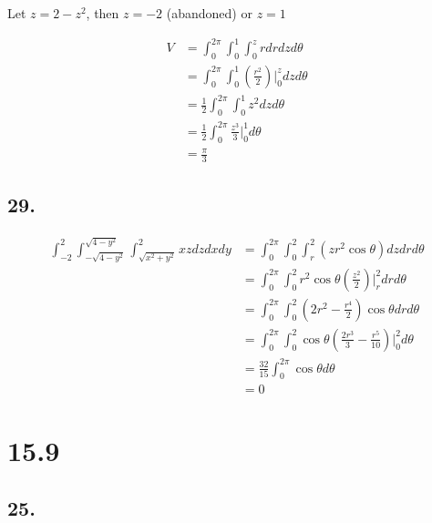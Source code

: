 \documentclass{article}
\begin{document}
  Let $z = 2 - z^2$, then $z = -2$ (abandoned) or $z = 1$

  $$\begin{aligned}
    V &= \int_0^{2\pi} \int_0^1 \int_0^z r dr dz d\theta \\
    &= \int_0^{2\pi} \int_0^1 (\frac{r^2}{2})\biggl|_0^z dz d\theta \\
    &= \frac 1 2 \int_0^{2\pi} \int_0^1 z^2 dz d\theta \\
    &= \frac 1 2 \int_0^{2\pi} \frac{z^3}{3}\biggl|_0^1 d\theta \\
    &= \frac{\pi}{3} 
  \end{aligned}$$

  \subsection*{29. }

  $$\begin{aligned}
    \int_{-2}^2 \int_{-\sqrt{4-y^2}}^{\sqrt{4-y^2}} \int_{\sqrt{x^2+y^2}}^2 xz dz dx dy &= \int_0^{2\pi} \int_0^2 \int_r^2 (zr^2 \cos \theta) dz dr d\theta \\
    &= \int_0^{2\pi} \int_0^2 r^2\cos \theta (\frac{z^2}{2})\biggl|_r^2 dr d\theta \\
    &= \int_0^{2\pi} \int_0^2 (2r^2 - \frac{r^4}{2})\cos \theta  dr d\theta \\
    &= \int_0^{2\pi} \int_0^2 \cos \theta (\frac{2r^3}{3} - \frac{r^5}{10})\biggl|_0^2 d\theta \\
    &= \frac{32}{15}\int_0^{2\pi} \cos \theta  d\theta \\
    &= 0
  \end{aligned}$$

  \section*{15.9}

  \subsection*{25. }
\end{document}
